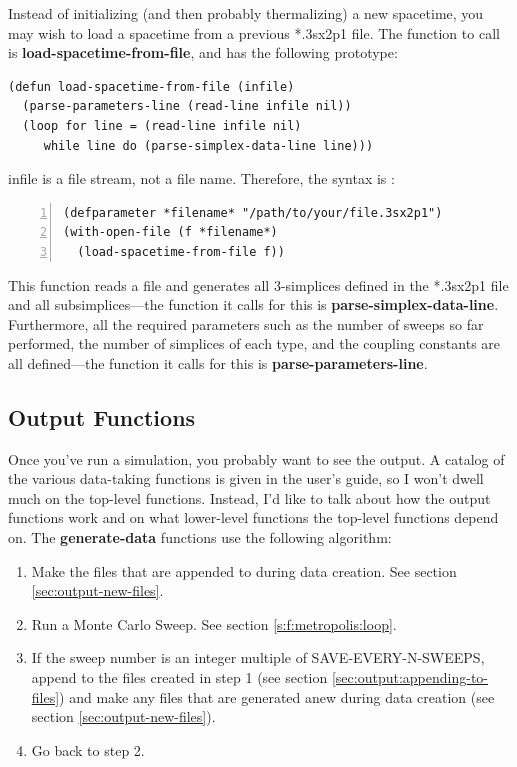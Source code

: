 \message{ !name(programmers_guide.tex)}\documentclass[12pt]{article}
\begin{document}
Instead of initializing (and then probably thermalizing) a new
spacetime, you may wish to load a spacetime from a previous *.3sx2p1
file. The function to call is \textbf{load-spacetime-from-file}, and
has the following prototype:
\begin{lstlisting}
(defun load-spacetime-from-file (infile)
  (parse-parameters-line (read-line infile nil))
  (loop for line = (read-line infile nil)
     while line do (parse-simplex-data-line line)))
\end{lstlisting}
infile is a file stream, not a file name. Therefore, the syntax is :
\begin{lstlisting}[numbers=left]
(defparameter *filename* "/path/to/your/file.3sx2p1")
(with-open-file (f *filename*)
  (load-spacetime-from-file f))
\end{lstlisting}
This function reads a file and generates all 3-simplices defined in
the *.3sx2p1 file and all subsimplices---the function it calls for
this is \textbf{parse-simplex-data-line}. Furthermore, all the
required parameters such as the number of sweeps so far performed, the
number of simplices of each type, and the coupling constants are all
defined---the function it calls for this is
\textbf{parse-parameters-line}.


\subsection{Output Functions}
\label{subsec:output}

Once you've run a simulation, you probably want to see the output. A
catalog of the various data-taking functions is given in the user's
guide, so I won't dwell much on the top-level functions. Instead, I'd
like to talk about how the output functions work and on what
lower-level functions the top-level functions depend on. The
\textbf{generate-data} functions use the following algorithm:
\begin{enumerate}
\item Make the files that are appended to during data creation. See
  section \ref{sec:output-new-files}.
\item Run a Monte Carlo Sweep. See section \ref{s:f:metropolis:loop}.
\item If the sweep number is an integer multiple of
  SAVE-EVERY-N-SWEEPS, append to the files created in step 1 (see
  section \ref{sec:output:appending-to-files}) and make any files that
  are generated anew during data creation (see section
  \ref{sec:output-new-files}).
\item Go back to step 2.
\end{enumerate}
\end{document}
